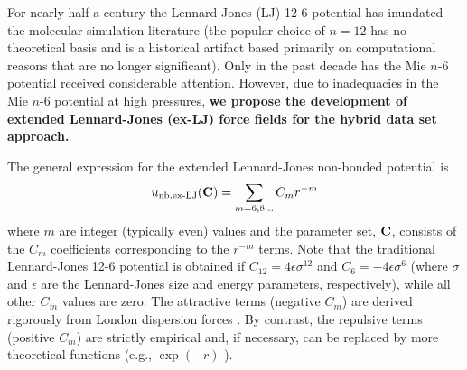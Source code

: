 \documentclass[12pt,a4paper]{article}
\newcommand{\bfm}[1]{{\bf #1}}
\newcommand{\C}{\bfm{C}}
\begin{document}






For nearly half a century the Lennard-Jones (LJ) 12-6 potential has inundated the molecular simulation literature (the popular choice of $n=12$ has no theoretical basis and is a historical artifact based primarily on computational reasons that are no longer significant). Only in the past decade has the Mie $n$-6 potential received considerable attention. However, due to inadequacies in the Mie $n$-6 potential at high pressures, \textbf{we propose the development of extended Lennard-Jones (ex-LJ) force fields for the hybrid data set approach.} 

The general expression for the extended Lennard-Jones non-bonded potential is
\begin{equation} \label{ex-LJ general}
u_{\rm nb, ex\text{-}LJ}(\C) = \sum_{m = 6, 8 ...} C_m r^{-m} 
\end{equation} 
where $m$ are integer (typically even) values and the parameter set, $\C$, consists of the $C_m$ coefficients corresponding to the $r^{-m}$ terms. Note that the traditional Lennard-Jones 12-6 potential is obtained if $C_{12} = 4\epsilon\sigma^{12}$ and $C_6=-4\epsilon\sigma^{6}$ (where $\sigma$ and $\epsilon$ are the Lennard-Jones size and energy parameters, respectively), while all other $C_m$ values are zero. The attractive terms (negative $C_m$) are derived rigorously from London dispersion forces \cite{Stone2013}. By contrast, the repulsive terms (positive $C_m$) are strictly empirical and, if necessary, can be replaced by more theoretical functions (e.g., $\exp(-r)$ \cite{Hellmann2017,Przybytek2017}). 
\end{document}
